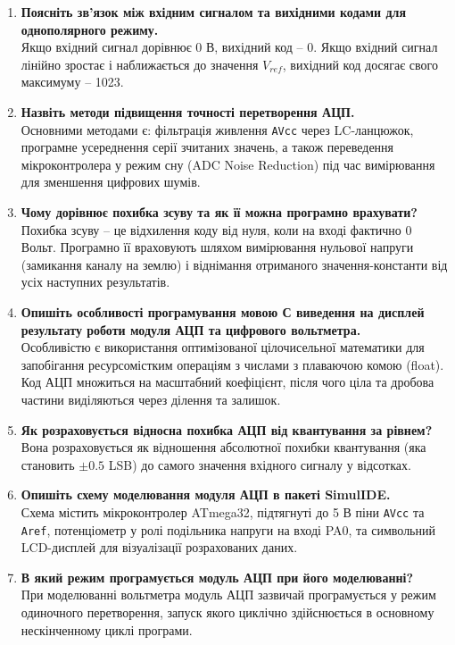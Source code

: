 \documentclass[14pt, a4paper]{extreport}
\begin{document}
\begin{enumerate}
		\item \textbf{Поясніть зв'язок між вхідним сигналом та вихідними кодами для однополярного режиму.} \\ Якщо вхідний сигнал дорівнює 0 В, вихідний код -- 0. Якщо вхідний сигнал лінійно зростає і наближається до значення $V_{ref}$, вихідний код досягає свого максимуму -- 1023.
		
		\item \textbf{Назвіть методи підвищення точності перетворення АЦП.} \\ Основними методами є: фільтрація живлення \texttt{AVcc} через LC-ланцюжок, програмне усереднення серії зчитаних значень, а також переведення мікроконтролера у режим сну (ADC Noise Reduction) під час вимірювання для зменшення цифрових шумів.
		
		\item \textbf{Чому дорівнює похибка зсуву та як її можна програмно врахувати?} \\ Похибка зсуву -- це відхилення коду від нуля, коли на вході фактично 0 Вольт. Програмно її враховують шляхом вимірювання нульової напруги (замикання каналу на землю) і віднімання отриманого значення-константи від усіх наступних результатів.
		
		\item \textbf{Опишіть особливості програмування мовою С виведення на дисплей результату роботи модуля АЦП та цифрового вольтметра.} \\ Особливістю є використання оптимізованої цілочисельної математики для запобігання ресурсомістким операціям з числами з плаваючою комою (float). Код АЦП множиться на масштабний коефіцієнт, після чого ціла та дробова частини виділяються через ділення та залишок.
		
		\item \textbf{Як розраховується відносна похибка АЦП від квантування за рівнем?} \\ Вона розраховується як відношення абсолютної похибки квантування (яка становить $\pm 0.5$ LSB) до самого значення вхідного сигналу у відсотках.
		
		\item \textbf{Опишіть схему моделювання модуля АЦП в пакеті SimulIDE.} \\ Схема містить мікроконтролер ATmega32, підтягнуті до 5 В піни \texttt{AVcc} та \texttt{Aref}, потенціометр у ролі подільника напруги на вході PA0, та символьний LCD-дисплей для візуалізації розрахованих даних.
		
		\item \textbf{В який режим програмується модуль АЦП при його моделюванні?} \\ При моделюванні вольтметра модуль АЦП зазвичай програмується у режим одиночного перетворення, запуск якого циклічно здійснюється в основному нескінченному циклі програми.
		

\end{enumerate}
\end{document}
